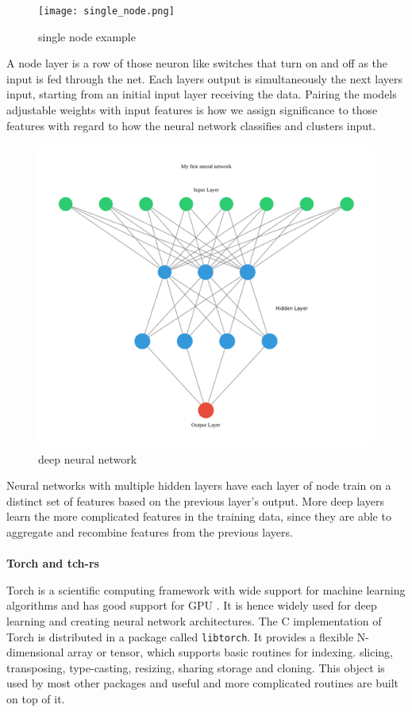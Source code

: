 \documentclass{book}
\begin{document}
\begin{figure}
	\centering
	\texttt{[image: single\_node.png]}
	\caption{single node example}
	\label{fig:single node example}
\end{figure}

A node layer is a row of those neuron like switches that turn on and off as the input is fed through the net. Each layers output is simultaneously the next layers input, starting from an initial input layer receiving the data. Pairing the models adjustable weights with input features is how we assign significance to those features with regard to how the neural network classifies and clusters input.

\begin{figure}
	\centering
	\includegraphics[width=0.8\linewidth]{deep_neural_network.png}
	\caption{deep neural network}
	\label{fig:deep neural network}
\end{figure}

Neural networks with multiple hidden layers have each layer of node train on a distinct set of features based on the previous layer's output. More deep layers learn the more complicated features in the training data, since they are able to aggregate and recombine features from the previous layers.

\paragraph{}%
\textbf{Torch and tch-rs}

Torch is a scientific computing framework with wide support for machine learning algorithms and has good support for GPU\cite{WEBSITE:12} . It is hence widely used for deep learning and creating neural network architectures. The C implementation of Torch is distributed in a package called \lstinline{libtorch}. It provides a flexible N-dimensional array or tensor, which supports basic routines for indexing. slicing, transposing, type-casting, resizing, sharing storage and cloning. This object is used by most other packages and useful and more complicated routines are built on top of it.
\end{document}
